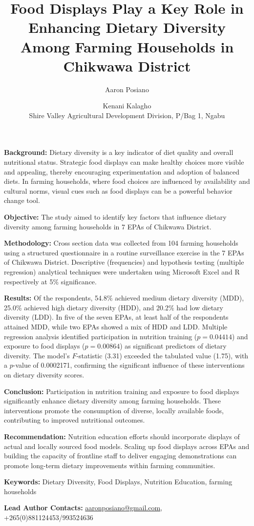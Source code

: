\documentclass[12pt]{article}
\title{Food Displays Play a Key Role in Enhancing Dietary Diversity Among Farming Households in Chikwawa District}
\author{Aaron Posiano \and Kenani Kalagho\\
\small Shire Valley Agricultural Development Division, P/Bag 1, Ngabu}
\date{}
\begin{document}
\maketitle

\noindent\textbf{Background:}
Dietary diversity is a key indicator of diet quality and overall nutritional status. Strategic food displays can make healthy choices more visible and appealing, thereby encouraging experimentation and adoption of balanced diets. In farming households, where food choices are influenced by availability and cultural norms, visual cues such as food displays can be a powerful behavior change tool.

\medskip
\noindent\textbf{Objective:}
The study aimed to identify key factors that influence dietary diversity among farming households in 7 EPAs of Chikwawa District.

\medskip
\noindent\textbf{Methodology:}
Cross section data was collected from 104 farming households using a structured questionnaire in a routine surveillance exercise in the 7 EPAs of Chikwawa District. Descriptive (frequencies) and hypothesis testing (multiple regression) analytical techniques were undertaken using Microsoft Excel and R respectively at 5\% significance.

\medskip
\noindent\textbf{Results:}
Of the respondents, 54.8\% achieved medium dietary diversity (MDD), 25.0\% achieved high dietary diversity (HDD), and 20.2\% had low dietary diversity (LDD). In five of the seven EPAs, at least half of the respondents attained MDD, while two EPAs showed a mix of HDD and LDD. Multiple regression analysis identified participation in nutrition training ($p = 0.04414$) and exposure to food displays ($p = 0.00864$) as significant predictors of dietary diversity. The model's $F$-statistic (3.31) exceeded the tabulated value (1.75), with a $p$-value of 0.0002171, confirming the significant influence of these interventions on dietary diversity scores.

\medskip
\noindent\textbf{Conclusion:}
Participation in nutrition training and exposure to food displays significantly enhance dietary diversity among farming households. These interventions promote the consumption of diverse, locally available foods, contributing to improved nutritional outcomes.

\medskip
\noindent\textbf{Recommendation:}
Nutrition education efforts should incorporate displays of actual and locally sourced food models. Scaling up food displays across EPAs and building the capacity of frontline staff to deliver engaging demonstrations can promote long-term dietary improvements within farming communities.

\medskip
\noindent\textbf{Keywords:} Dietary Diversity, Food Displays, Nutrition Education, farming households

\medskip
\noindent\textbf{Lead Author Contacts:}
\href{mailto:aaronposiano@gmail.com}{aaronposiano@gmail.com},
+265(0)881124453/993524636
\end{document}

